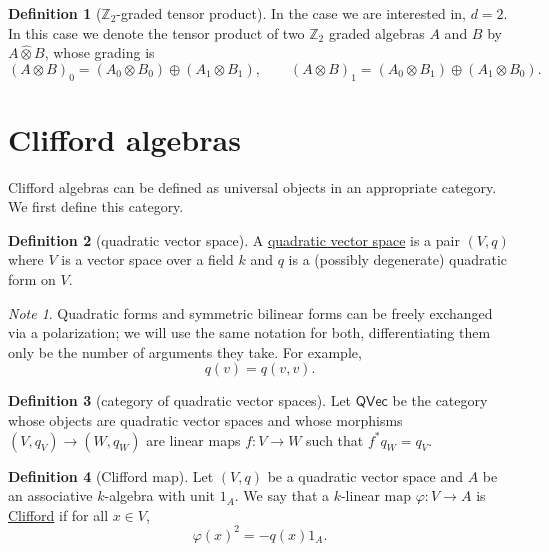 \documentclass[a4paper]{report}
\newcommand{\Z}{\mathbb{Z}}
\newcommand{\defn}[1]{\ul{#1}}
\theoremstyle{definition}
\newtheorem{definition}{Definition}[section]
\theoremstyle{plain}
\theoremstyle{remark}
\newtheorem{note}{Note}[section]
\begin{document}
\begin{definition}[$\Z_2$-graded tensor product]
  \label{def:z2gradedtensorproduct}
  In the case we are interested in, $d = 2$. In this case we denote the tensor product of two $\Z_{2}$ graded algebras $A$ and $B$ by $A \hat{\otimes} B$, whose grading is
  \begin{equation*}
    (A \otimes B)_{0} = (A_{0}\otimes B_{0}) \oplus (A_{1} \otimes B_{1}),\qquad
    (A \otimes B)_{1} = (A_{0}\otimes B_{1}) \oplus (A_{1} \otimes B_{0}).
  \end{equation*}
\end{definition}


\section{Clifford algebras}
Clifford algebras can be defined as universal objects in an appropriate category. We first define this category.
\begin{definition}[quadratic vector space]
  \label{def:quadraticvectorspace}
  A \defn{quadratic vector space} is a pair $(V, q)$ where $V$ is a vector space over a field $k$ and $q$ is a (possibly degenerate) quadratic form on $V$.
\end{definition}
\begin{note}
  Quadratic forms and symmetric bilinear forms can be freely exchanged via a polarization; we will use the same notation for both, differentiating them only be the number of arguments they take. For example,
  \begin{equation*}
    q(v) = q(v,v).
  \end{equation*}
\end{note}

\begin{definition}[category of quadratic vector spaces]
  \label{def:categoryofquadraticvectorspaces}
  Let $\mathsf{QVec}$ be the category whose objects are quadratic vector spaces and whose morphisms $(V, q_{V}) \to (W, q_{W})$ are linear maps $f\colon V \to W$ such that $f^{*}q_{W} = q_{V}$.
\end{definition}

\begin{definition}[Clifford map]
  \label{def:cliffordmap}
  Let $(V,q)$ be a quadratic vector space and $A$ be an associative $k$-algebra with unit $1_{A}$. We say that a $k$-linear map $\varphi\colon V \to A$ is \defn{Clifford} if for all $x \in V$,
  \begin{equation*}
    \varphi(x)^{2} = -q(x)1_{A}.
  \end{equation*}
\end{definition}
\end{document}
